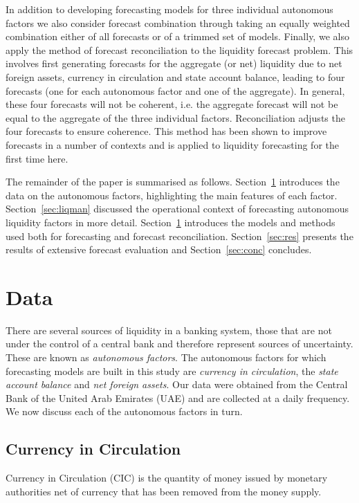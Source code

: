 \documentclass{article}
\begin{document}
In addition to developing forecasting models for three individual autonomous factors we also consider forecast combination through taking an equally weighted combination either of all forecasts or of a trimmed set of models. Finally, we also apply the method of forecast reconciliation to the liquidity forecast problem. This involves first generating forecasts for the aggregate (or net) liquidity due to net foreign assets, currency in circulation and state account balance, leading to four forecasts (one for each autonomous factor and one of the aggregate). In general, these four forecasts will not be coherent, i.e. the aggregate forecast will not be equal to the aggregate of the three individual factors. Reconciliation adjusts the four forecasts to ensure coherence. This method has been shown to improve forecasts in a number of contexts and is applied to liquidity forecasting for the first time here.

The remainder of the paper is summarised as follows. Section~\ref{sec:data} introduces the data on the autonomous factors, highlighting the main features of each factor. Section~\ref{sec:liqman} discussed the operational context of forecasting autonomous liquidity factors in more detail. Section~\ref{sec:data} introduces the models and methods used both for forecasting and forecast reconciliation. Section~\ref{sec:res} presents the results of extensive forecast evaluation and Section~\ref{sec:conc} concludes.

\section{Data}\label{sec:data}

There are several sources of liquidity in a banking system, those that are not under the control of a central bank and therefore represent sources of uncertainty. These are known as \textit{autonomous factors}. The autonomous factors for which forecasting models are built in this study are \textit{currency in circulation}, the \textit{state account balance} and \textit{net foreign assets}. Our data were obtained from the Central Bank of the United Arab Emirates (UAE) and are collected at a daily frequency. We now discuss each of the autonomous factors in turn.

\subsection{Currency in Circulation}

Currency in Circulation (CIC) is the quantity of money issued by monetary authorities net of currency that has been removed from the money supply. 
\end{document}
